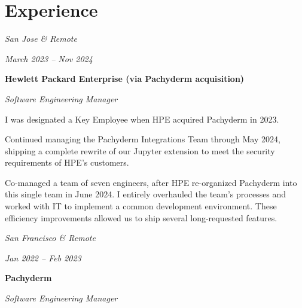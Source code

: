 \documentclass[10pt, letterpaper]{article}
\begin{document}
\section{Experience}

\begin{twocolentry}{
    \textit{San Jose \& Remote}

    \textit{March 2023 – Nov 2024}
}
    \textbf{Hewlett Packard Enterprise (via Pachyderm acquisition)}

    \textit{Software Engineering Manager}
\end{twocolentry}

\vspace{0.1 cm}

\begin{onecolentry}
    \begin{highlights}
        \item I was designated a Key Employee when HPE acquired Pachyderm in 2023.
        \item Continued managing the Pachyderm Integrations Team through May 2024, shipping a complete rewrite of our Jupyter extension to meet the security requirements of HPE's customers.
        \item Co-managed a team of seven engineers, after HPE re-organized Pachyderm into this single team in June 2024. I entirely overhauled the team's processes and worked with IT to implement a common development environment. These efficiency improvements allowed us to ship several long-requested features.
    \end{highlights}
\end{onecolentry}

\vspace{0.2 cm}

\begin{twocolentry}{
    \textit{San Francisco \& Remote}

    \textit{Jan 2022 – Feb 2023}
}
    \textbf{Pachyderm}

    \textit{Software Engineering Manager}
\end{twocolentry}

\vspace{0.1 cm}
\end{document}
